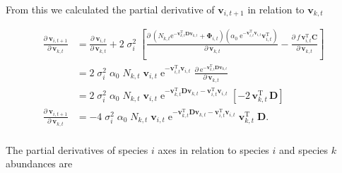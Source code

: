 From this we calculated the partial derivative of $\mathbf{v}_{i,t+1}$ in relation to
$\mathbf{v}_{k,t}$


\begin{equation*}
\begin{split}
    \frac{ \partial \: \mathbf{v}_{i,t+1} }{ \partial \: \mathbf{v}_{k,t} } &=
        \frac{ \partial \: \mathbf{v}_{i,t} }{ \partial \: \mathbf{v}_{k,t} } +
        2 \; \sigma_i^2 \;
        \left[
            \frac{ \partial \:
                \left(
                    N_{k,t} \textrm{e}^{- \mathbf{v}_{k,t}^{\textrm{T}} \mathbf{D}
                    \mathbf{v}_{k,t}} + \mathbf{\Phi}_{i,t}
                \right)
                \left(
                    \alpha_0 \; \textrm{e}^{ - \mathbf{v}_{i,t}^{\textrm{T}}
                    \mathbf{v}_{i,t} } \mathbf{v}_{i,t}^{\textrm{T}}
                \right)
            }{ \partial \:  \mathbf{v}_{k,t} } -
            \frac{ \partial \:  f \, \mathbf{v}_{i,t}^{\textrm{T}} \mathbf{C} }{
            \partial \: \mathbf{v}_{k,t} }
        \right] \\
    &= 2 \; \sigma_i^2 \; \alpha_0 \; N_{k,t} \; \mathbf{v}_{i,t} \;
        \textrm{e}^{ - \mathbf{v}_{i,t}^{\textrm{T}}
        \mathbf{v}_{i,t} } \; 
        \frac{ \partial \:
                \textrm{e}^{
                    - \mathbf{v}_{k,t}^{\textrm{T}} \mathbf{D} \mathbf{v}_{k,t}
                    }
            }{ \partial \:  \mathbf{v}_{k,t} } \\
    &= 2 \; \sigma_i^2 \; \alpha_0 \; N_{k,t} \; \mathbf{v}_{i,t} \;
        \textrm{e}^{
                    - \mathbf{v}_{k,t}^{\textrm{T}} \mathbf{D} \mathbf{v}_{k,t}
                    - \mathbf{v}_{i,t}^{\textrm{T}} \mathbf{v}_{i,t}
                } \;
        \left[ 
            - 2 \, \mathbf{v}_{k,t}^{\textrm{T}} \, \mathbf{D}
        \right] \\
    \frac{ \partial \: \mathbf{v}_{i,t+1} }{ \partial \: \mathbf{v}_{k,t}} &=
        -4 \; \sigma_i^2 \; \alpha_0 \; N_{k,t} \; \mathbf{v}_{i,t} \;
        \textrm{e}^{
                    - \mathbf{v}_{k,t}^{\textrm{T}} \mathbf{D} \mathbf{v}_{k,t}
                    - \mathbf{v}_{i,t}^{\textrm{T}} \mathbf{v}_{i,t}
                } \;
        \mathbf{v}_{k,t}^{\textrm{T}} \; \mathbf{D}
    \textrm{.} \\
\end{split}
\end{equation*}

The partial derivatives of species $i$ axes in relation to species $i$ 
and species $k$ abundances are

